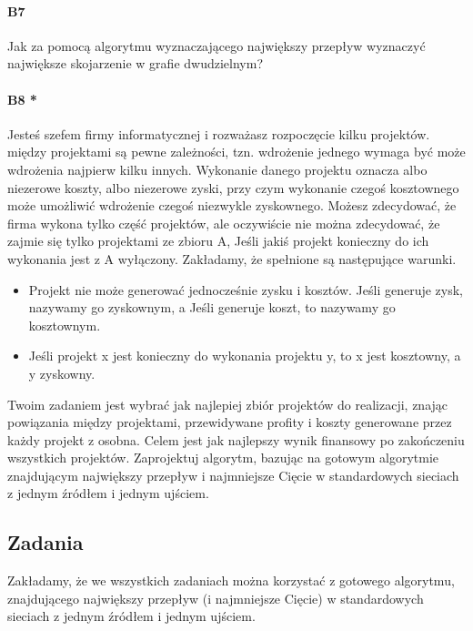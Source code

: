 \paragraph{B7} Jak za pomocą algorytmu wyznaczającego największy przepływ wyznaczyć największe skojarzenie w grafie dwudzielnym?

\paragraph{B8 * } Jesteś szefem firmy informatycznej i rozważasz rozpoczęcie kilku projektów. między projektami są pewne zależności, tzn. wdrożenie jednego wymaga być może wdrożenia najpierw kilku innych. Wykonanie danego projektu oznacza albo niezerowe koszty, albo niezerowe zyski, przy czym wykonanie czegoś kosztownego może umożliwić wdrożenie czegoś niezwykle zyskownego. Możesz zdecydować, że firma wykona tylko część projektów, ale oczywiście nie można zdecydować, że zajmie się tylko projektami ze zbioru A, Jeśli jakiś projekt konieczny do ich wykonania jest z A wyłączony. Zakładamy, że spełnione są następujące warunki.
\begin{itemize}
\item Projekt nie może generować jednocześnie zysku i kosztów. Jeśli generuje zysk, nazywamy go zyskownym, a Jeśli generuje koszt, to nazywamy go kosztownym.
\item Jeśli projekt x jest konieczny do wykonania projektu y, to x jest kosztowny, a y zyskowny.
\end{itemize}
Twoim zadaniem jest wybrać jak najlepiej zbiór projektów do realizacji, znając powiązania między projektami, przewidywane profity i koszty generowane przez każdy projekt z osobna. Celem jest jak najlepszy wynik finansowy po zakończeniu wszystkich projektów. Zaprojektuj algorytm, bazując na gotowym algorytmie znajdującym największy przepływ i najmniejsze Cięcie w standardowych sieciach z jednym źródłem i jednym ujściem.


\subsection{Zadania}
Zakładamy, że we wszystkich zadaniach można korzystać z gotowego algorytmu, znajdującego największy przepływ (i najmniejsze Cięcie) w standardowych sieciach z jednym źródłem i jednym ujściem.

